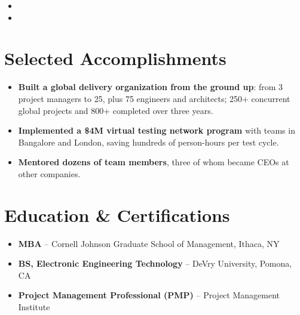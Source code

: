 \documentclass[11pt,letterpaper,sans]{moderncv}
\begin{document}
\begin{itemize}
\item{}

\vspace{3pt}

\item{}

\end{itemize}


\section{Selected Accomplishments}
\vspace{1pt}
\begin{itemize}
\item {\textbf{Built a global delivery organization from the ground up}: from 3 project managers to 25, plus 75 engineers and architects; 250+ concurrent global projects and 800+ completed over three years.}
\item {\textbf{Implemented a \$4M virtual testing network program} with teams in Bangalore and London, saving hundreds of person-hours per test cycle.}
\item {\textbf{Mentored dozens of team members}, three of whom became CEOs at other companies.}
\end{itemize}


\section{Education \& Certifications}
\vspace{1pt}
\begin{itemize}
\item{\textbf{MBA} -- Cornell Johnson Graduate School of Management, Ithaca, NY}
\item{\textbf{BS, Electronic Engineering Technology} -- DeVry University, Pomona, CA}
\item{\textbf{Project Management Professional (PMP)} -- Project Management Institute}
\end{itemize}
\end{document}
